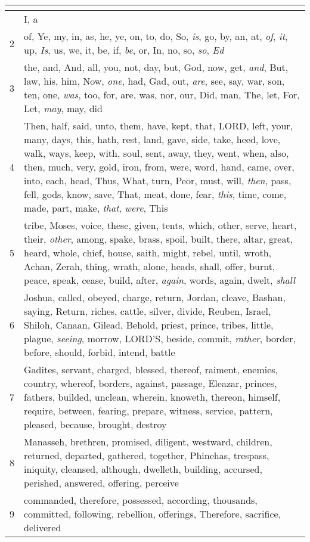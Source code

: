 \begin{center}
\begin{longtable}{l|p{3.75in}}
\hline \multicolumn{2}{c}{{ }} \\ \hline
\endfoot 
1 & I, a\\ \hline 
2 & of, Ye, my, in, as, he, ye, on, to, do, So, \emph{is}, go, by, an, at, \emph{of}, \emph{it}, up, \emph{Is}, us, we, it, be, if, \emph{be}, or, In, no, so, \emph{so}, \emph{Ed}\\ \hline 
3 & the, and, And, all, you, not, day, but, God, now, get, \emph{and}, But, law, his, him, Now, \emph{one}, had, Gad, out, \emph{are}, see, say, war, son, ten, one, \emph{was}, too, for, are, was, nor, our, Did, man, The, let, For, Let, \emph{may}, may, did\\ \hline 
4 & Then, half, said, unto, them, have, kept, that, LORD, left, your, many, days, this, hath, rest, land, gave, side, take, heed, love, walk, ways, keep, with, soul, sent, away, they, went, when, also, then, much, very, gold, iron, from, were, word, hand, came, over, into, each, head, Thus, What, turn, Peor, must, will, \emph{then}, pass, fell, gods, know, save, That, meat, done, fear, \emph{this}, time, come, made, part, make, \emph{that}, \emph{were}, This\\ \hline 
5 & tribe, Moses, voice, these, given, tents, which, other, serve, heart, their, \emph{other}, among, spake, brass, spoil, built, there, altar, great, heard, whole, chief, house, saith, might, rebel, until, wroth, Achan, Zerah, thing, wrath, alone, heads, shall, offer, burnt, peace, speak, cease, build, after, \emph{again}, words, again, dwelt, \emph{shall}\\ \hline 
6 & Joshua, called, obeyed, charge, return, Jordan, cleave, Bashan, saying, Return, riches, cattle, silver, divide, Reuben, Israel, Shiloh, Canaan, Gilead, Behold, priest, prince, tribes, little, plague, \emph{seeing}, morrow, LORD'S, beside, commit, \emph{rather}, border, before, should, forbid, intend, battle\\ \hline 
7 & Gadites, servant, charged, blessed, thereof, raiment, enemies, country, whereof, borders, against, passage, Eleazar, princes, fathers, builded, unclean, wherein, knoweth, thereon, himself, require, between, fearing, prepare, witness, service, pattern, pleased, because, brought, destroy\\ \hline 
8 & Manasseh, brethren, promised, diligent, westward, children, returned, departed, gathered, together, Phinehas, trespass, iniquity, cleansed, although, dwelleth, building, accursed, perished, answered, offering, perceive\\ \hline 
9 & commanded, therefore, possessed, according, thousands, committed, following, rebellion, offerings, Therefore, sacrifice, delivered\\ \hline 

\end{longtable}
\end{center}
